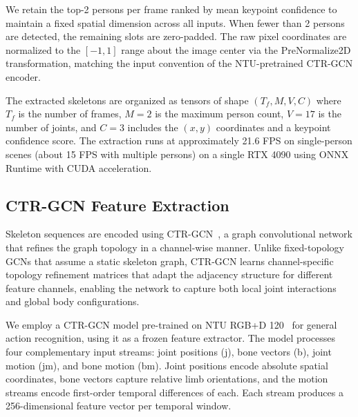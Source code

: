 \documentclass[sigconf]{acmart}
\begin{document}
We retain the top-2 persons per frame ranked by mean keypoint confidence to maintain a fixed spatial dimension across all inputs. When fewer than 2 persons are detected, the remaining slots are zero-padded. The raw pixel coordinates are normalized to the $[-1, 1]$ range about the image center via the PreNormalize2D transformation, matching the input convention of the NTU-pretrained CTR-GCN encoder.

The extracted skeletons are organized as tensors of shape $(T_f, M, V, C)$ where $T_f$ is the number of frames, $M=2$ is the maximum person count, $V=17$ is the number of joints, and $C=3$ includes the $(x, y)$ coordinates and a keypoint confidence score. The extraction runs at approximately 21.6 FPS on single-person scenes (about 15 FPS with multiple persons) on a single RTX 4090 using ONNX Runtime with CUDA acceleration.

\subsection{CTR-GCN Feature Extraction}

Skeleton sequences are encoded using CTR-GCN~\cite{chen2021ctrgcn}, a graph convolutional network that refines the graph topology in a channel-wise manner. Unlike fixed-topology GCNs that assume a static skeleton graph, CTR-GCN learns channel-specific topology refinement matrices that adapt the adjacency structure for different feature channels, enabling the network to capture both local joint interactions and global body configurations.

We employ a CTR-GCN model pre-trained on NTU RGB+D 120~\cite{yan2022pyskl} for general action recognition, using it as a frozen feature extractor. The model processes four complementary input streams: joint positions (j), bone vectors (b), joint motion (jm), and bone motion (bm). Joint positions encode absolute spatial coordinates, bone vectors capture relative limb orientations, and the motion streams encode first-order temporal differences of each. Each stream produces a 256-dimensional feature vector per temporal window.
\end{document}
